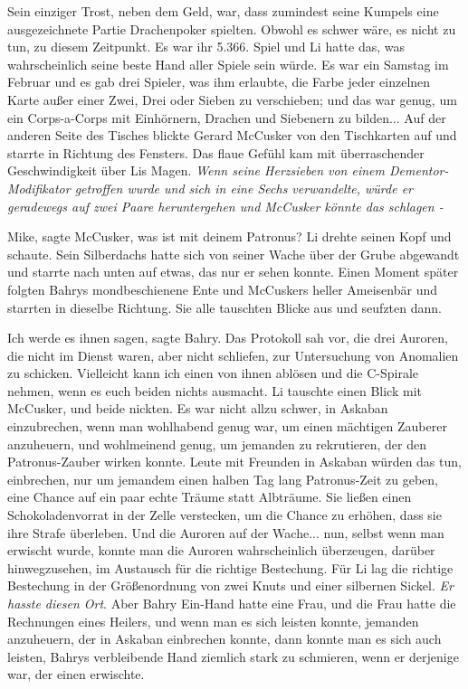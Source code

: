 Sein einziger Trost, neben dem Geld, war, dass zumindest seine Kumpels eine
ausgezeichnete Partie Drachenpoker spielten. Obwohl es schwer wäre, es nicht zu
tun, zu diesem Zeitpunkt. Es war ihr 5.366. Spiel und Li hatte das, was
wahrscheinlich seine beste Hand aller Spiele sein würde. Es war ein Samstag im
Februar und es gab drei Spieler, was ihm erlaubte, die Farbe jeder einzelnen
Karte außer einer Zwei, Drei oder Sieben zu verschieben; und das war genug, um
ein Corps-a-Corps mit Einhörnern, Drachen und Siebenern zu bilden... Auf der
anderen Seite des Tisches blickte Gerard McCusker von den Tischkarten auf und
starrte in Richtung des Fensters. Das flaue Gefühl kam mit überraschender
Geschwindigkeit über Lis Magen. \emph{Wenn seine Herzsieben von einem
Dementor-Modifikator getroffen wurde und sich in eine Sechs verwandelte, würde
er geradewegs auf zwei Paare heruntergehen und McCusker könnte das schlagen -}

\glqq{}Mike\grqq{}, sagte McCusker, \glqq{}was ist mit deinem Patronus?\grqq{} Li drehte
seinen Kopf und schaute. Sein Silberdachs hatte sich von seiner Wache über der
Grube abgewandt und starrte nach unten auf etwas, das nur er sehen konnte. Einen
Moment später folgten Bahrys mondbeschienene Ente und McCuskers heller
Ameisenbär und starrten in dieselbe Richtung. Sie alle tauschten Blicke aus und
seufzten dann.

\glqq{}Ich werde es ihnen sagen,\grqq{} sagte Bahry. Das Protokoll sah vor, die
drei Auroren, die nicht im Dienst waren, aber nicht schliefen, zur Untersuchung
von Anomalien zu schicken. \glqq{}Vielleicht kann ich einen von ihnen ablösen und
die C-Spirale nehmen, wenn es euch beiden nichts ausmacht.\grqq{} Li tauschte einen
Blick mit McCusker, und beide nickten. Es war nicht allzu schwer, in Askaban
einzubrechen, wenn man wohlhabend genug war, um einen mächtigen Zauberer
anzuheuern, und wohlmeinend genug, um jemanden zu rekrutieren, der den
Patronus-Zauber wirken konnte. Leute mit Freunden in Askaban würden das tun,
einbrechen, nur um jemandem einen halben Tag lang Patronus-Zeit zu geben, eine
Chance auf ein paar echte Träume statt Albträume. Sie ließen einen
Schokoladenvorrat in der Zelle verstecken, um die Chance zu erhöhen, dass sie
ihre Strafe überleben. Und die Auroren auf der Wache... nun, selbst wenn man
erwischt wurde, konnte man die Auroren wahrscheinlich überzeugen, darüber
hinwegzusehen, im Austausch für die richtige Bestechung. Für Li lag die richtige
Bestechung in der Größenordnung von zwei Knuts und einer silbernen Sickel.
\emph{Er hasste diesen Ort}. Aber Bahry Ein-Hand hatte eine Frau, und die Frau
hatte die Rechnungen eines Heilers, und wenn man es sich leisten konnte,
jemanden anzuheuern, der in Askaban einbrechen konnte, dann konnte man es sich
auch leisten, Bahrys verbleibende Hand ziemlich stark zu schmieren, wenn er
derjenige war, der einen erwischte.

